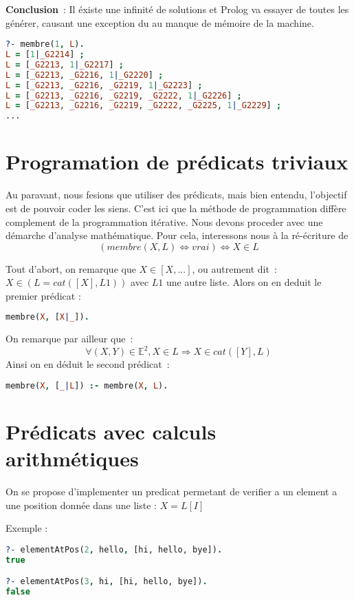 \textbf{Conclusion}~: Il éxiste une infinité de solutions et Prolog va essayer
de toutes les générer, causant une exception du au manque de mémoire de la
machine.

\begin{lstlisting}[language=Prolog,frame=single]
?- membre(1, L).
L = [1|_G2214] ;
L = [_G2213, 1|_G2217] ;
L = [_G2213, _G2216, 1|_G2220] ;
L = [_G2213, _G2216, _G2219, 1|_G2223] ;
L = [_G2213, _G2216, _G2219, _G2222, 1|_G2226] ;
L = [_G2213, _G2216, _G2219, _G2222, _G2225, 1|_G2229] ;
...
\end{lstlisting}


\section{Programation de prédicats triviaux}

Au paravant, nous fesions que utiliser des prédicats, mais bien entendu,
l'objectif est de pouvoir coder les siens. C'est ici que la méthode de programmation diffère
complement de la programmation itérative. Nous devons proceder avec une démarche
d'analyse mathématique. Pour cela, interessons nous à la ré-écriture de
\[(membre(X, L) \Leftrightarrow vrai) \Leftrightarrow X \in L\]

Tout d'abort, on remarque que $X \in [X, ...]$, ou autrement dit~:
$X \in (L = cat([X], L1))$ avec $L1$ une autre liste. Alors on en deduit le
premier prédicat :
\begin{lstlisting}[language=Prolog,frame=single]
membre(X, [X|_]).
\end{lstlisting}

On remarque par ailleur que~:
\[\forall (X, Y) \in \mathbb{E}^2, X \in L \Rightarrow X \in cat([Y], L)\]
Ainsi on en déduit le second prédicat~:
\begin{lstlisting}[language=Prolog,frame=single]
membre(X, [_|L]) :- membre(X, L).
\end{lstlisting}


\section{Prédicats avec calculs arithmétiques}

On se propose d'implementer un predicat permetant de verifier a un element a une
position donnée dans une liste : $X = L[I]$

Exemple :
\begin{lstlisting}[language=Prolog,frame=single]
?- elementAtPos(2, hello, [hi, hello, bye]).
true

?- elementAtPos(3, hi, [hi, hello, bye]).
false
\end{lstlisting}


